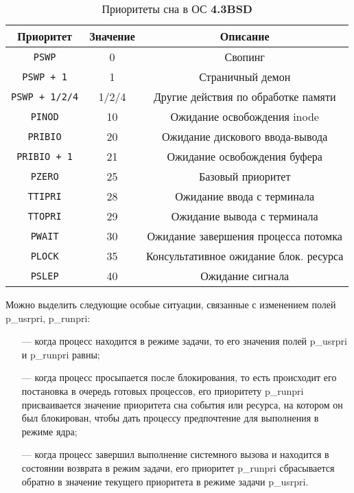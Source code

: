 \begin{table}[h!]
	\caption{Приоритеты
		сна в ОС \textbf{4.3BSD}}
	\label{tab:bsd}
	\begin{center}
		\begin{tabular}{ |c|c|c|  }
			\hline
			\textbf{Приоритет} & \textbf{Значение} & \textbf{Описание} \\
			\hline
			\texttt{PSWP} & 0 & Свопинг \\
			\hline
			\texttt{PSWP + 1} & 1 & Страничный демон \\
			\hline
			\texttt{PSWP + 1/2/4} & 1/2/4 & Другие действия по обработке памяти \\
			\hline
			\texttt{PINOD} & 10 & Ожидание освобождения inode \\
			\hline
			\texttt{PRIBIO} & 20 & Ожидание дискового ввода-вывода \\
			\hline
			\texttt{PRIBIO + 1} & 21 & Ожидание освобождения буфера \\
			\hline
			\texttt{PZERO} & 25 & Базовый приоритет \\
			\hline
			\texttt{TTIPRI} & 28 & Ожидание ввода с терминала \\
			\hline
			\texttt{TTOPRI} & 29 & Ожидание вывода с терминала \\
			\hline 
			\texttt{PWAIT} & 30 & Ожидание завершения процесса потомка \\
			\hline
			\texttt{PLOCK} & 35 & Консультативное ожидание блок. ресурса \\
			\hline
			\texttt{PSLEP} & 40 & Ожидание сигнала \\
			\hline
		\end{tabular}
	\end{center}
\end{table}

Можно выделить следующие особые ситуации, связанные с изменением полей p\_usrpri, p\_runpri:
\begin{itemize}
	\item[---] когда процесс находится в режиме задачи, то его значения полей p\_usrpri и p\_runpri равны;
	\item[---] когда процесс просыпается после блокирования, то есть происходит его постановка в очередь готовых процессов, его приоритету p\_runpri присваивается значение приоритета сна события или ресурса, на котором он был блокирован, чтобы дать процессу предпочтение для выполнения в режиме ядра;
	\item[---] когда процесс завершил выполнение системного вызова и находится в состоянии возврата в режим задачи, его приоритет p\_runpri сбрасывается обратно в значение текущего приоритета в режиме задачи p\_usrpri.
\end{itemize}

